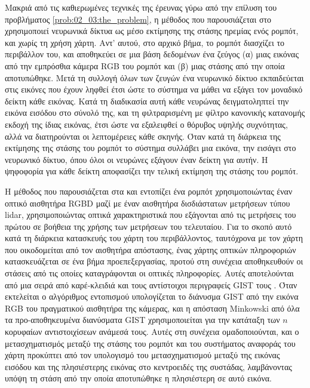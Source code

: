 Μακριά από τις καθιερωμένες τεχνικές της έρευνας γύρω από την επίλυση του
προβλήματος \ref{prob:02_03:the_problem}, η μέθοδος που παρουσιάζεται στο
\cite{Lyrio2014} χρησιμοποιεί νευρωνικά δίκτυα ως μέσο εκτίμησης της στάσης
ηρεμίας ενός ρομπότ, και χωρίς τη χρήση χάρτη. Αντ' αυτού, στο αρχικό βήμα, το
ρομπότ διασχίζει το περιβάλλον του, και αποθηκεύει σε μια βάση δεδομένων ένα
ζεύγος (α) μιας εικόνας από την εμπρόσθια κάμερα RGB του ρομπότ και (β) μιας
στάσης από την οποία αποτυπώθηκε.  Μετά τη συλλογή όλων των ζευγών ένα
νευρωνικό δίκτυο εκπαιδεύεται στις εικόνες που έχουν ληφθεί έτσι ώστε το
σύστημα να μάθει να εξάγει τον μοναδικό δείκτη κάθε εικόνας. Κατά τη διαδικασία
αυτή κάθε νευρώνας δειγματοληπτεί την εικόνα εισόδου στο σύνολό της, και τη
φιλτραρισμένη με φίλτρο κανονικής κατανομής εκδοχή της ίδιας εικόνας, έτσι ώστε
να εξαλειφθεί ο θόρυβος υψηλής συχνότητας, αλλά να διατηρούνται οι λεπτομέρειες
κάθε σκηνής.  Όταν κατά τη διάρκεια της εκτίμησης της στάσης του ρομπότ το
σύστημα συλλάβει μια εικόνα, την εισάγει στο νευρωνικό δίκτυο, όπου όλοι οι
νευρώνες εξάγουν έναν δείκτη για αυτήν. Η ψηφοφορία για κάθε δείκτη αποφασίζει
την τελική εκτίμηση της στάσης του ρομπότ.

Η μέθοδος που παρουσιάζεται στα \cite{Su2017} και \cite{Chen2019b} εντοπίζει
ένα ρομπότ χρησιμοποιώντας έναν οπτικό αισθητήρα RGBD μαζί με έναν αισθητήρα
δισδιάστατων μετρήσεων τύπου lidar, χρησιμοποιώντας οπτικά χαρακτηριστικά που
εξάγονται από τις μετρήσεις του πρώτου σε βοήθεια της χρήσης των μετρήσεων του
τελευταίου. Για το σκοπό αυτό κατά τη διάρκεια κατασκευής του χάρτη του
περιβάλλοντος, ταυτόχρονα με τον χάρτη που οικοδομείται από τον αισθητήρα
απόστασης, ένας χάρτης οπτικών πληροφοριών κατασκευάζεται σε ένα βήμα
προεπεξεργασίας, προτού στη συνέχεια αποθηκευθούν οι στάσεις από τις οποίες
καταγράφονται οι οπτικές πληροφορίες. Αυτές αποτελούνται από μια σειρά από
καρέ-κλειδιά και τους αντίστοιχοι περιγραφείς GIST τους
\cite{Singh2010,Azzi2015}. Όταν εκτελείται ο αλγόριθμος εντοπισμού
υπολογίζεται το διάνυσμα GIST από την εικόνα RGB του πραγματικού αισθητήρα της
κάμερας, και η απόσταση Minkowski από όλα τα προ-αποθηκευμένα διανύσματα GIST
χρησιμοποιείται για την κατάταξη των $n$ κορυφαίων αντιστοιχίσεων ανάμεσά τους.
Αυτές στη συνέχεια ομαδοποιούνται, και ο μετασχηματισμός μεταξύ της στάσης του
ρομπότ και του συστήματος αναφοράς του χάρτη προκύπτει από τον υπολογισμό του
μετασχηματισμού μεταξύ της εικόνας εισόδου και της πλησιέστερης εικόνας στο
κεντροειδές της συστάδας, λαμβάνοντας υπόψη τη στάση από την οποία αποτυπώθηκε
η πλησιέστερη σε αυτό εικόνα.

